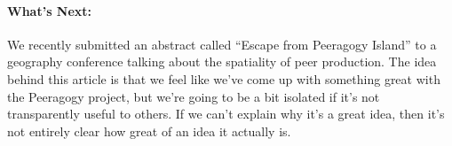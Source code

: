 \paragraph{What's Next:} We recently submitted an abstract called ``Escape
from Peeragogy Island'' to a geography conference talking about the
spatiality of peer production. The idea behind this article is that we
feel like we've come up with something great with the Peeragogy project,
but we're going to be a bit isolated if it's not transparently useful to
others. If we can't explain why it's a great idea, then it's not
entirely clear how great of an idea it actually is.
